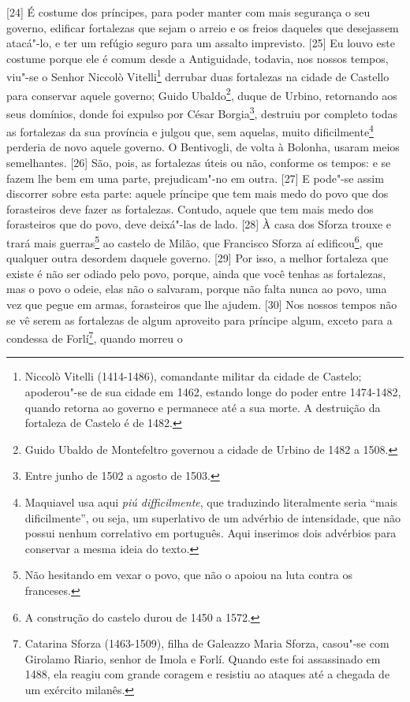 {[}24{]} É costume dos príncipes, para poder manter com mais segurança o
seu governo, edificar fortalezas que sejam o arreio e os freios daqueles
que desejassem atacá"-lo, e ter um refúgio seguro para um assalto
imprevisto. {[}25{]} Eu louvo este costume porque ele é comum desde a
Antiguidade, todavia, nos nossos tempos, viu"-se o Senhor Niccolò
Vitelli\footnote{Niccolò Vitelli (1414-1486), comandante militar da
  cidade de Castelo; apoderou"-se de sua cidade em 1462, estando longe do
  poder entre 1474-1482, quando retorna ao governo e permanece até a sua
  morte. A destruição da fortaleza de Castelo é de 1482.} derrubar duas
fortalezas na cidade de Castello para conservar aquele governo; Guido
Ubaldo\footnote{Guido Ubaldo de Montefeltro governou a cidade de Urbino
  de 1482 a 1508.}, duque de Urbino, retornando aos seus domínios, donde
foi expulso por César Borgia\footnote{Entre junho de 1502 a agosto de
  1503.}, destruiu por completo todas as fortalezas da sua província e
julgou que, sem aquelas, muito dificilmente\footnote{Maquiavel usa aqui
  \emph{piú difficilmente}, que traduzindo literalmente seria ``mais
  dificilmente'', ou seja, um superlativo de um advérbio de intensidade,
  que não possui nenhum correlativo em português. Aqui inserimos dois
  advérbios para conservar a mesma ideia do texto.} perderia de novo
aquele governo. O Bentivogli, de volta à Bolonha, usaram meios
semelhantes. {[}26{]} São, pois, as fortalezas úteis ou não, conforme os
tempos: e se fazem lhe bem em uma parte, prejudicam"-no em outra.
{[}27{]} E pode"-se assim discorrer sobre esta parte: aquele príncipe que
tem mais medo do povo que dos forasteiros deve fazer as fortalezas.
Contudo, aquele que tem mais medo dos forasteiros que do povo, deve
deixá"-las de lado. {[}28{]} À casa dos Sforza trouxe e trará mais
guerras\footnote{Não hesitando em vexar o povo, que não o apoiou na luta
  contra os franceses.} ao castelo de Milão, que Francisco Sforza aí
edificou\footnote{A construção do castelo durou de 1450 a 1572.}, que
qualquer outra desordem daquele governo. {[}29{]} Por isso, a melhor
fortaleza que existe é não ser odiado pelo povo, porque, ainda que você
tenhas as fortalezas, mas o povo o odeie, elas não o salvaram, porque
não falta nunca ao povo, uma vez que pegue em armas, forasteiros que lhe
ajudem. {[}30{]} Nos nossos tempos não se vê serem as fortalezas de
algum aproveito para príncipe algum, exceto para a condessa de
Forlí\footnote{Catarina Sforza (1463-1509), filha de Galeazzo Maria
  Sforza, casou"-se com Girolamo Riario, senhor de Imola e Forlí. Quando
  este foi assassinado em 1488, ela reagiu com grande coragem e resistiu
  ao ataques até a chegada de um exército milanês.}, quando morreu o
